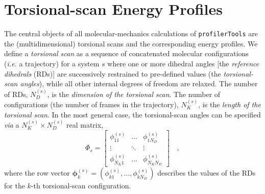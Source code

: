 \documentclass[10pt,a4paper,openany]{memoir}
\numberwithin{equation}{section}
\newcommand{\profilertools}[0]{\texttt{profilerTools}}
\begin{document}
% 
%   


\section{Torsional-scan Energy Profiles}
\label{sec:ga-tpes}

The central objects of all molecular-mechanics calculations of
\profilertools{} are the (multidimensional) torsional scans and the
corresponding energy profiles.
%
We define a \textit{torsional scan} as a sequence of concatenated
molecular configurations (\textit{i.e.} a trajectory) for a system $s$
where one or more dihedral angles [the \textit{reference dihedrals}
(RDs)] are successively restrained to pre-defined values (the
\textit{torsional-scan angles}), while all other internal degrees of
freedom are relaxed.
%
The number of RDs, $N_D^{(s)}$, is the \textit{dimension of the torsional
  scan}.
%
The number of configurations (the number of frames in the trajectory),
$N_K^{(s)}$, is the \textit{length of the torsional scan}.
%
In the most general case, the torsional-scan angles can be specified
\textit{via} a $N_K^{(s)} \times N_D^{(s)}$ real matrix,
\begin{equation}
  \label{eq:spec-matrix}
  \Phi_s = \left[
    \begin{array}{ccc}
      \phi_{11}^{(s)} & \ldots & \phi_{1N_D}^{(s)} \\
      \vdots & \ddots & \vdots \\
      \phi_{N_K1}^{(s)} & \ldots & \phi_{N_KN_D}^{(s)}
  \end{array}
  \right] \quad ,
\end{equation}
where the row vector
\( \boldsymbol{\phi}_k^{(s)} = (\phi_{k1}^{(s)},\ldots,\phi_{kN_D}^{(s)} ) \) describes
the values of the RDs for the $k$-th torsional-scan configuration.
\end{document}
